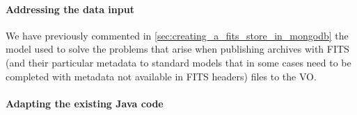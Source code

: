 \paragraph*{Addressing the data input}
\label{sec:data_input}
We have previously commented in \ref{sec:creating_a_fits_store_in_mongodb} the model used to solve the problems that arise when publishing archives with FITS (and their particular metadata to standard models that in some cases need to be completed with metadata not available in FITS headers) files to the VO.

\paragraph*{Adapting the existing Java code}
\label{sec:spring_mongo}